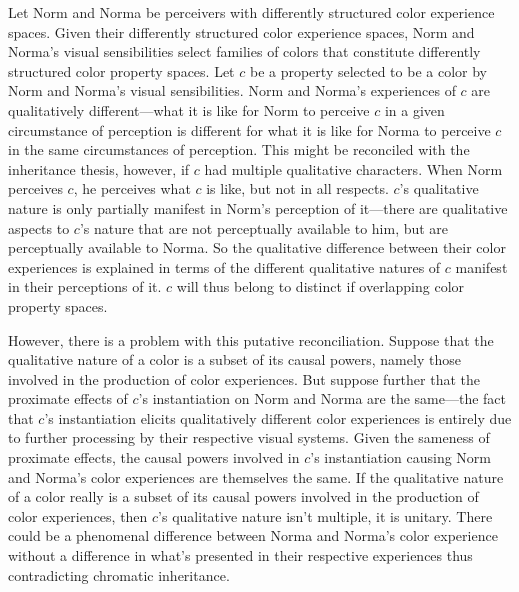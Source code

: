 \documentclass[12pt]{article}
\begin{document}
Let Norm and Norma be perceivers with differently structured color experience spaces. Given their differently structured color experience spaces, Norm and Norma's visual sensibilities select families of colors that constitute differently structured color property spaces. Let $c$ be a property selected to be a color by Norm and Norma's visual sensibilities. Norm and Norma's experiences of $c$ are qualitatively different---what it is like for Norm to perceive $c$ in a given circumstance of perception is different for what it is like for Norma to perceive $c$ in the same circumstances of perception. This might be reconciled with the inheritance thesis, however, if $c$ had multiple qualitative characters. When Norm perceives $c$, he perceives what $c$ is like, but not in all respects. $c$'s qualitative nature is only partially manifest in Norm's perception of it---there are qualitative aspects to $c$'s nature that are not perceptually available to him, but are perceptually available to Norma. So the qualitative difference between their color experiences is explained in terms of the different qualitative natures of $c$ manifest in their perceptions of it. $c$ will thus belong to distinct if overlapping color property spaces.

However, there is a problem with this putative reconciliation. Suppose that the qualitative nature of a color is a subset of its causal powers, namely those involved in the production of color experiences. But suppose further that the proximate effects of $c$'s instantiation on Norm and Norma are the same---the fact that $c$'s instantiation elicits qualitatively different color experiences is entirely due to further processing by their respective visual systems. Given the sameness of proximate effects, the causal powers involved in $c$'s instantiation causing Norm and Norma's color experiences are themselves the same. If the qualitative nature of a color really is a subset of its causal powers involved in the production of color experiences, then $c$'s qualitative nature isn't multiple, it is unitary. There could be a phenomenal difference between Norma and Norma's color experience without a difference in what's presented in their respective experiences thus contradicting chromatic inheritance.
\end{document}
